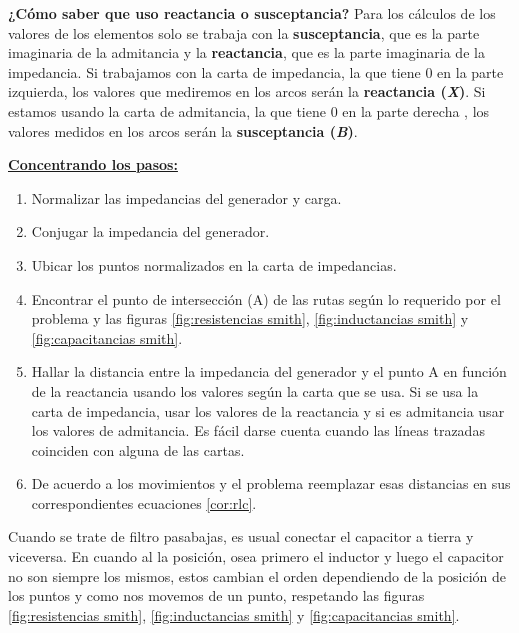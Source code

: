\documentclass[
	12pt, %
	fleqn, %
	a4paper, %
	oneside, %
]{LegrandOrangeBook}
\begin{document}
\begin{remark}
\textbf{¿Cómo saber que uso reactancia o susceptancia?} Para los cálculos de los valores de los elementos solo se trabaja con la \textbf{susceptancia}, que es la parte imaginaria de la admitancia y la \textbf{reactancia}, que es la parte imaginaria de la impedancia. Si trabajamos con la carta de impedancia, la que tiene 0 en la parte izquierda, los valores que mediremos en los arcos serán la \textbf{reactancia (\textit{X})}. Si estamos usando la carta de admitancia, la que tiene 0 en la parte derecha , los valores medidos en los arcos serán la \textbf{susceptancia (\textit{B})}.
\end{remark}
\underline{\textbf{Concentrando los pasos:}}
\begin{enumerate}
\item Normalizar las impedancias del generador y carga.
\item Conjugar la impedancia del generador.
\item Ubicar los puntos normalizados en la carta de impedancias.
\item Encontrar el punto de intersección (A) de las rutas según lo requerido por el problema y las figuras \ref{fig:resistencias smith}, \ref{fig:inductancias smith} y \ref{fig:capacitancias smith}.
\item Hallar la distancia entre la impedancia del generador y el punto A en función de la reactancia usando los valores según la carta que se usa. Si se usa la carta de impedancia, usar los valores de la reactancia y si es admitancia usar los valores de admitancia. Es fácil darse cuenta cuando las líneas trazadas coinciden con alguna de las cartas.
\item De acuerdo a los movimientos y el problema reemplazar esas distancias en sus correspondientes ecuaciones \ref{cor:rlc}.
\end{enumerate}
\begin{notation}
Cuando se trate de filtro pasabajas, es usual conectar el capacitor a tierra y viceversa. En cuando al la posición, osea primero el inductor y luego el capacitor no son siempre los mismos, estos cambian el orden dependiendo de la posición de los puntos y como nos movemos de un punto, respetando las figuras \ref{fig:resistencias smith}, \ref{fig:inductancias smith} y \ref{fig:capacitancias smith}.
\end{notation}
\end{document}
